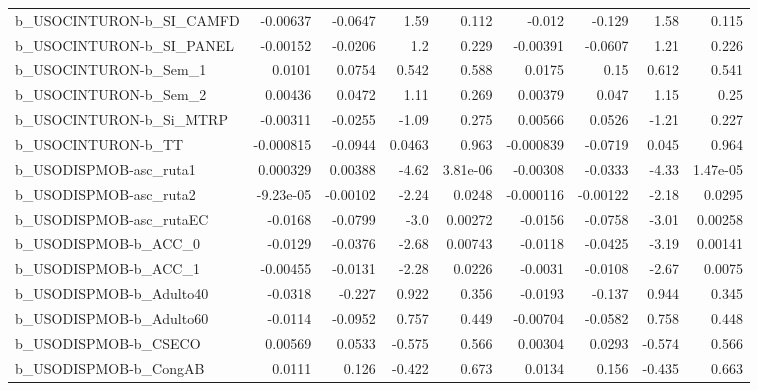 \begin{tabular}{lrrrrrrrr}
b\_USOCINTURON-b\_SI\_CAMFD   &    -0.00637 &      -0.0647 &      1.59 &    0.112 &     -0.012 &      -0.129 &         1.58 &         0.115 \\
b\_USOCINTURON-b\_SI\_PANEL   &    -0.00152 &      -0.0206 &       1.2 &    0.229 &   -0.00391 &     -0.0607 &         1.21 &         0.226 \\
b\_USOCINTURON-b\_Sem\_1      &      0.0101 &       0.0754 &     0.542 &    0.588 &     0.0175 &        0.15 &        0.612 &         0.541 \\
b\_USOCINTURON-b\_Sem\_2      &     0.00436 &       0.0472 &      1.11 &    0.269 &    0.00379 &       0.047 &         1.15 &          0.25 \\
b\_USOCINTURON-b\_Si\_MTRP    &    -0.00311 &      -0.0255 &     -1.09 &    0.275 &    0.00566 &      0.0526 &        -1.21 &         0.227 \\
b\_USOCINTURON-b\_TT         &   -0.000815 &      -0.0944 &    0.0463 &    0.963 &  -0.000839 &     -0.0719 &        0.045 &         0.964 \\
b\_USODISPMOB-asc\_ruta1     &    0.000329 &      0.00388 &     -4.62 & 3.81e-06 &   -0.00308 &     -0.0333 &        -4.33 &      1.47e-05 \\
b\_USODISPMOB-asc\_ruta2     &   -9.23e-05 &     -0.00102 &     -2.24 &   0.0248 &  -0.000116 &    -0.00122 &        -2.18 &        0.0295 \\
b\_USODISPMOB-asc\_rutaEC    &     -0.0168 &      -0.0799 &      -3.0 &  0.00272 &    -0.0156 &     -0.0758 &        -3.01 &       0.00258 \\
b\_USODISPMOB-b\_ACC\_0       &     -0.0129 &      -0.0376 &     -2.68 &  0.00743 &    -0.0118 &     -0.0425 &        -3.19 &       0.00141 \\
b\_USODISPMOB-b\_ACC\_1       &    -0.00455 &      -0.0131 &     -2.28 &   0.0226 &    -0.0031 &     -0.0108 &        -2.67 &        0.0075 \\
b\_USODISPMOB-b\_Adulto40    &     -0.0318 &       -0.227 &     0.922 &    0.356 &    -0.0193 &      -0.137 &        0.944 &         0.345 \\
b\_USODISPMOB-b\_Adulto60    &     -0.0114 &      -0.0952 &     0.757 &    0.449 &   -0.00704 &     -0.0582 &        0.758 &         0.448 \\
b\_USODISPMOB-b\_CSECO       &     0.00569 &       0.0533 &    -0.575 &    0.566 &    0.00304 &      0.0293 &       -0.574 &         0.566 \\
b\_USODISPMOB-b\_CongAB      &      0.0111 &        0.126 &    -0.422 &    0.673 &     0.0134 &       0.156 &       -0.435 &         0.663 \\

\end{tabular}
